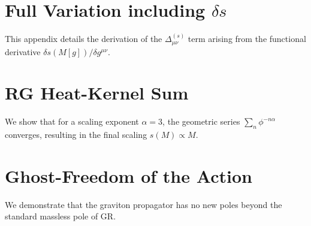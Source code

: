 \appendix
\section{Full Variation including $\delta s$}
\label{app:variation_full}
This appendix details the derivation of the $\Delta_{\mu\nu}^{(s)}$ term arising from the functional derivative $\delta s(M[g]) / \delta g^{\mu\nu}$.

\section{RG Heat-Kernel Sum}
\label{app:heat_kernel}
We show that for a scaling exponent $\alpha=3$, the geometric series $\sum_n \phi^{-n\alpha}$ converges, resulting in the final scaling $s(M) \propto M$.

\section{Ghost-Freedom of the Action}
\label{app:ghost_freedom}
We demonstrate that the graviton propagator has no new poles beyond the standard massless pole of GR.




